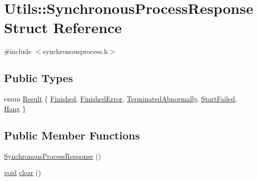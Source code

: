\hypertarget{struct_utils_1_1_synchronous_process_response}{\section{\-Utils\-:\-:\-Synchronous\-Process\-Response \-Struct \-Reference}
\label{struct_utils_1_1_synchronous_process_response}
}


{\ttfamily \#include $<$synchronousprocess.\-h$>$}

\subsection*{\-Public \-Types}
\begin{DoxyCompactItemize}
\item 
enum \hyperlink{struct_utils_1_1_synchronous_process_response_aa7b2d882cf93d074f4392e57a6603f2c}{\-Result} \{ \*
\hyperlink{struct_utils_1_1_synchronous_process_response_aa7b2d882cf93d074f4392e57a6603f2ca18d8397aeda3a545906837b296c1171a}{\-Finished}, 
\hyperlink{struct_utils_1_1_synchronous_process_response_aa7b2d882cf93d074f4392e57a6603f2ca244c73ca6d92e59323ceae0929e1bb90}{\-Finished\-Error}, 
\hyperlink{struct_utils_1_1_synchronous_process_response_aa7b2d882cf93d074f4392e57a6603f2ca08b186b062d11abc1b32a4a7542e8be5}{\-Terminated\-Abnormally}, 
\hyperlink{struct_utils_1_1_synchronous_process_response_aa7b2d882cf93d074f4392e57a6603f2cab7005460ed0d7509cc0217d23494e9ac}{\-Start\-Failed}, 
\*
\hyperlink{struct_utils_1_1_synchronous_process_response_aa7b2d882cf93d074f4392e57a6603f2ca6d890cffeb6427f93f514581ff329247}{\-Hang}
 \}
\end{DoxyCompactItemize}
\subsection*{\-Public \-Member \-Functions}
\begin{DoxyCompactItemize}
\item 
\hyperlink{struct_utils_1_1_synchronous_process_response_a6b60ad7826c2dae839904a7e9af56c3b}{\-Synchronous\-Process\-Response} ()
\item 
\hyperlink{group___u_a_v_objects_plugin_ga444cf2ff3f0ecbe028adce838d373f5c}{void} \hyperlink{struct_utils_1_1_synchronous_process_response_aecd76e9c1f68cd239d60976036614924}{clear} ()
\end{DoxyCompactItemize}
